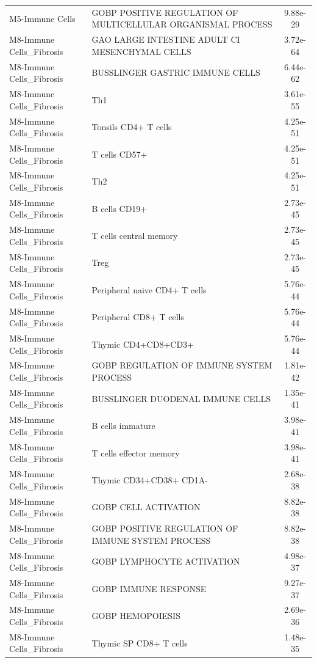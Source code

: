 \documentclass[
]{article}
\begin{document}
\begin{singlespace}
\begin{longtable}[t]{>{\raggedright\arraybackslash}p{1.4in}>{\raggedright\arraybackslash}p{4.5in}c}
M5-Immune Cells & GOBP POSITIVE REGULATION OF MULTICELLULAR ORGANISMAL PROCESS & 9.88e-29\\
\addlinespace
M8-Immune Cells\_Fibrosis & GAO LARGE INTESTINE ADULT CI MESENCHYMAL CELLS & 3.72e-64\\
M8-Immune Cells\_Fibrosis & BUSSLINGER GASTRIC IMMUNE CELLS & 6.44e-62\\
M8-Immune Cells\_Fibrosis & Th1 & 3.61e-55\\
M8-Immune Cells\_Fibrosis & Tonsils CD4+ T cells & 4.25e-51\\
M8-Immune Cells\_Fibrosis & T cells CD57+ & 4.25e-51\\
\addlinespace
M8-Immune Cells\_Fibrosis & Th2 & 4.25e-51\\
M8-Immune Cells\_Fibrosis & B cells CD19+ & 2.73e-45\\
M8-Immune Cells\_Fibrosis & T cells central memory & 2.73e-45\\
M8-Immune Cells\_Fibrosis & Treg & 2.73e-45\\
M8-Immune Cells\_Fibrosis & Peripheral naive CD4+ T cells & 5.76e-44\\
\addlinespace
M8-Immune Cells\_Fibrosis & Peripheral CD8+ T cells & 5.76e-44\\
M8-Immune Cells\_Fibrosis & Thymic CD4+CD8+CD3+ & 5.76e-44\\
M8-Immune Cells\_Fibrosis & GOBP REGULATION OF IMMUNE SYSTEM PROCESS & 1.81e-42\\
M8-Immune Cells\_Fibrosis & BUSSLINGER DUODENAL IMMUNE CELLS & 1.35e-41\\
M8-Immune Cells\_Fibrosis & B cells immature & 3.98e-41\\
\addlinespace
M8-Immune Cells\_Fibrosis & T cells effector memory & 3.98e-41\\
M8-Immune Cells\_Fibrosis & Thymic CD34+CD38+ CD1A- & 2.68e-38\\
M8-Immune Cells\_Fibrosis & GOBP CELL ACTIVATION & 8.82e-38\\
M8-Immune Cells\_Fibrosis & GOBP POSITIVE REGULATION OF IMMUNE SYSTEM PROCESS & 8.82e-38\\
M8-Immune Cells\_Fibrosis & GOBP LYMPHOCYTE ACTIVATION & 4.98e-37\\
\addlinespace
M8-Immune Cells\_Fibrosis & GOBP IMMUNE RESPONSE & 9.27e-37\\
M8-Immune Cells\_Fibrosis & GOBP HEMOPOIESIS & 2.69e-36\\
M8-Immune Cells\_Fibrosis & Thymic SP CD8+ T cells & 1.48e-35\\

\end{longtable}
\end{singlespace}
\end{document}
